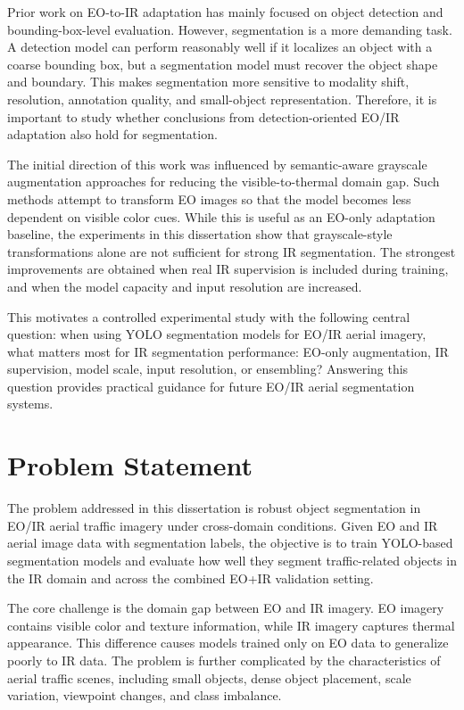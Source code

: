 Prior work on EO-to-IR adaptation has mainly focused on object detection and bounding-box-level evaluation. However, segmentation is a more demanding task. A detection model can perform reasonably well if it localizes an object with a coarse bounding box, but a segmentation model must recover the object shape and boundary. This makes segmentation more sensitive to modality shift, resolution, annotation quality, and small-object representation. Therefore, it is important to study whether conclusions from detection-oriented EO/IR adaptation also hold for segmentation.

The initial direction of this work was influenced by semantic-aware grayscale augmentation approaches for reducing the visible-to-thermal domain gap. Such methods attempt to transform EO images so that the model becomes less dependent on visible color cues. While this is useful as an EO-only adaptation baseline, the experiments in this dissertation show that grayscale-style transformations alone are not sufficient for strong IR segmentation. The strongest improvements are obtained when real IR supervision is included during training, and when the model capacity and input resolution are increased.

This motivates a controlled experimental study with the following central question: when using YOLO segmentation models for EO/IR aerial imagery, what matters most for IR segmentation performance: EO-only augmentation, IR supervision, model scale, input resolution, or ensembling? Answering this question provides practical guidance for future EO/IR aerial segmentation systems.

\section{Problem Statement}

The problem addressed in this dissertation is robust object segmentation in EO/IR aerial traffic imagery under cross-domain conditions. Given EO and IR aerial image data with segmentation labels, the objective is to train YOLO-based segmentation models and evaluate how well they segment traffic-related objects in the IR domain and across the combined EO+IR validation setting.

The core challenge is the domain gap between EO and IR imagery. EO imagery contains visible color and texture information, while IR imagery captures thermal appearance. This difference causes models trained only on EO data to generalize poorly to IR data. The problem is further complicated by the characteristics of aerial traffic scenes, including small objects, dense object placement, scale variation, viewpoint changes, and class imbalance.

